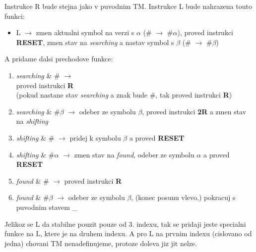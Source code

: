 \documentclass[a4paper]{article}
\begin{document}
Instrukce R bude stejna jako v puvodnim TM. Instrukce L bude nahrazena touto funkci:
\begin{itemize}
    \item L $\rightarrow$ zmen aktualni symbol na verzi s $\alpha$ (\# $\rightarrow$ \#$\alpha$), proved instrukci \textbf{RESET}, zmen stav na \textit{searching} a nastav symbol s $\beta$ (\# $\rightarrow$ \#$\beta$)
\end{itemize}
A pridame dalsi prechodove funkce:
\begin{enumerate}
    \item \textit{searching} \& \# $\rightarrow$\\proved instrukci \textbf{R}\\
    (pokud nastane stav \textit{searching} a znak bude \#, tak proved instrukci \textbf{R})
    \item \textit{searching} \& \#$\beta$ $\rightarrow$ odeber ze symbolu $\beta$, proved instrukci \textbf{2R} a zmen stav na \textit{shifting}
    \item \textit{shifting} \& \# $\rightarrow$ pridej k symbolu $\beta$ a proved \textbf{RESET}
    \item \textit{shifting} \& \#$\alpha$ $\rightarrow$ zmen stav na \textit{found}, odeber ze symbolu $\alpha$ a proved \textbf{RESET}
    \item \textit{found} \& \# $\rightarrow$ proved instrukci \textbf{R}
    \item \textit{found} \& \#$\beta$ $\rightarrow$ odeber ze symbolu $\beta$, (konec posunu vlevo,) pokracuj s puvodnim stavem \_
\end{enumerate}

Jelikoz se L da stabilne pouzit pouze od 3. indexu, tak se pridaji jeste specialni funkce na L, ktere je na druhem indexu.
A pro L na prvnim indexu (cislovano od jedna) chovani TM nenadefinujeme, protoze doleva jiz jit nelze. 
\end{document}
